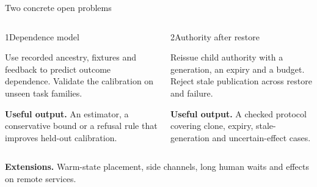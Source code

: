 \begin{frame}[t]{\ev{\tagP}Two concrete open problems}
\vspace{.1cm}
\begin{columns}[T,onlytextwidth]
\begin{block}{1\enspace Dependence model}
{\small Use recorded ancestry, fixtures and feedback to predict outcome dependence. Validate the calibration on unseen task families.\par}
\vspace{.15cm}
{\small\color{Teal}\textbf{Useful output.} An estimator, a conservative bound or a refusal rule that improves held-out calibration.\par}
\end{block}
\begin{block}{2\enspace Authority after restore}
{\small Reissue child authority with a generation, an expiry and a budget. Reject stale publication across restore and failure.\par}
\vspace{.15cm}
{\small\color{Teal}\textbf{Useful output.} A checked protocol covering clone, expiry, stale-generation and uncertain-effect cases.\par}
\end{block}
\end{columns}
\vspace{.35cm}
{\small\color{Muted}\textbf{Extensions.} Warm-state placement, side channels, long human waits and effects on remote services.\par}
\end{frame}
